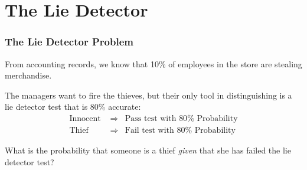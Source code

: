 \documentclass{beamer}
\begin{document}
\section{The Lie Detector}
\begin{frame}
\frametitle{The Lie Detector Problem}
\begin{block}{From accounting records, we know that 10\% of employees in the store are stealing merchandise.}
\end{block}
\begin{block}{The managers want to fire the thieves, but their only tool in distinguishing is a lie detector test that is 80\% accurate:}
	\begin{eqnarray*}
	\mbox{Innocent } &\Rightarrow& \mbox{Pass test with } 80\% \mbox{ Probability}\\
	\mbox{Thief} &\Rightarrow& \mbox{Fail test with } 80\% \mbox{ Probability}
	\end{eqnarray*}
\end{block}

\pause
\begin{alertblock}{What is the probability that someone is a thief \emph{given} that she has failed the lie detector test? }
\end{alertblock}

\end{frame}
\end{document}
